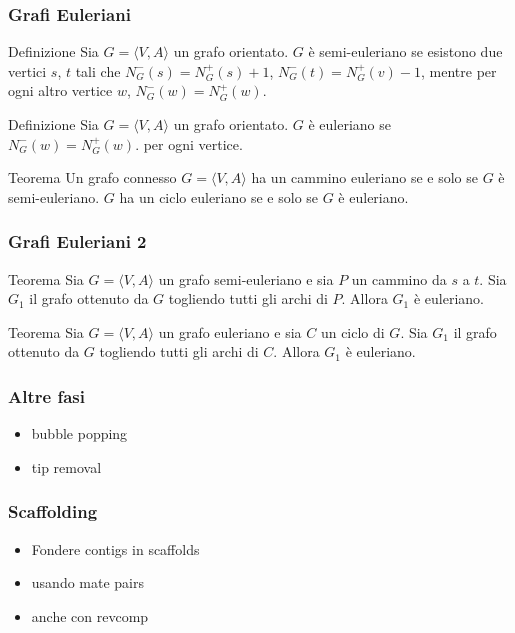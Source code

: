 \begin{frame}[fragile]
\frametitle{Grafi Euleriani}
\begin{block}{Definizione}
Sia $G=\langle  V,A \rangle$ un grafo orientato.
$G$ è semi-euleriano se esistono due vertici $s$, $t$ tali che $N^{-}_{G}(s) =
N^{+}_{G}(s) +1$,  $N^{-}_{G}(t) = N^{+}_{G}(v) -1$, mentre per ogni altro
vertice $w$,  $N^{-}_{G}(w) =N^{+}_{G}(w)$.
\end{block}

\begin{block}{Definizione}
Sia $G=\langle  V,A \rangle$ un grafo orientato.
$G$ è euleriano se $N^{-}_{G}(w) =N^{+}_{G}(w)$. per ogni
vertice.
\end{block}

\begin{block}{Teorema}
Un grafo connesso $G=\langle  V,A \rangle$ ha un cammino euleriano se e solo se $G$ è semi-euleriano.
$G$ ha un ciclo euleriano se e solo se $G$ è euleriano.
\end{block}
\end{frame}


\begin{frame}[fragile]
\frametitle{Grafi Euleriani 2}

\begin{block}{Teorema}
Sia $G=\langle  V,A \rangle$ un grafo semi-euleriano e sia $P$ un  cammino da $s$ a $t$.
Sia $G_{1}$ il grafo ottenuto da $G$ togliendo tutti gli archi di $P$.
Allora $G_{1}$ è euleriano.
\end{block}

\begin{block}{Teorema}
Sia $G=\langle  V,A \rangle$ un grafo euleriano e sia $C$ un ciclo di $G$.
Sia $G_{1}$ il grafo ottenuto da $G$ togliendo tutti gli archi di $C$.
Allora $G_{1}$ è euleriano.
\end{block}
\end{frame}

\begin{frame}[fragile]
\frametitle{Altre fasi}
\begin{itemize}
\item
bubble popping
\item
tip removal
\end{itemize}
\end{frame}

\begin{frame}[fragile]
\frametitle{Scaffolding}

\begin{itemize}
\item
Fondere contigs in scaffolds
\item
usando mate pairs
\item
anche con revcomp
\end{itemize}
\end{frame}


